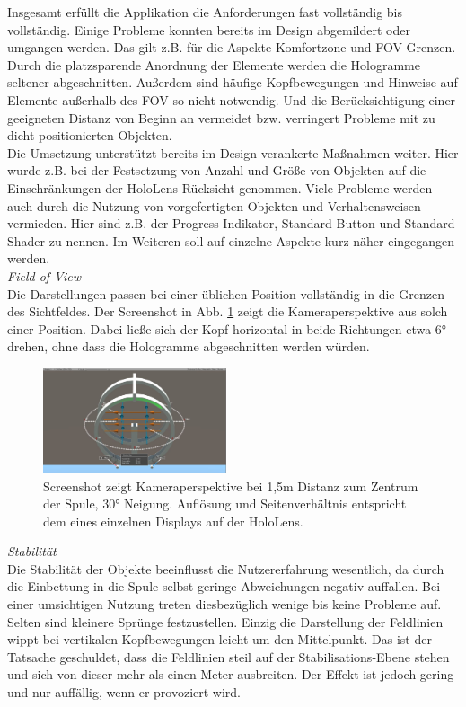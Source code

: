 Insgesamt erfüllt die Applikation die Anforderungen fast vollständig bis vollständig. Einige Probleme konnten bereits im Design abgemildert oder umgangen werden. Das gilt z.B. für die Aspekte Komfortzone und FOV-Grenzen. Durch die platzsparende Anordnung der Elemente werden die Hologramme seltener abgeschnitten. Außerdem sind häufige Kopfbewegungen und Hinweise auf Elemente außerhalb des FOV so nicht notwendig. Und die Berücksichtigung einer geeigneten Distanz von Beginn an vermeidet bzw. verringert Probleme mit zu dicht positionierten Objekten.\\

Die Umsetzung unterstützt bereits im Design verankerte Maßnahmen weiter. Hier wurde z.B. bei der Festsetzung von Anzahl und Größe von Objekten auf die Einschränkungen der HoloLens Rücksicht genommen. Viele Probleme werden auch durch die Nutzung von vorgefertigten Objekten und Verhaltensweisen vermieden. Hier sind z.B. der Progress Indikator, Standard-Button und Standard-Shader zu nennen. Im Weiteren soll auf einzelne Aspekte kurz näher eingegangen werden.\\

\textit{Field of View}\\
Die Darstellungen passen bei einer üblichen Position vollständig in die Grenzen des Sichtfeldes. Der Screenshot in Abb. \ref{img:fov} zeigt die Kameraperspektive aus solch einer Position. Dabei ließe sich der Kopf horizontal in beide Richtungen etwa 6° drehen, ohne dass die Hologramme abgeschnitten werden würden.
\begin{figure}
	\centering
	\includegraphics[width=0.48\textwidth]{images/fov.jpg}
	\caption{Screenshot zeigt Kameraperspektive bei 1,5m Distanz zum Zentrum der Spule, 30° Neigung. Auflösung und Seitenverhältnis entspricht dem eines einzelnen Displays auf der HoloLens.}
	\label{img:fov}
\end{figure}

\textit{Stabilität}\\
Die Stabilität der Objekte beeinflusst die Nutzererfahrung wesentlich, da durch die Einbettung in die Spule selbst geringe Abweichungen negativ auffallen. Bei einer umsichtigen Nutzung treten diesbezüglich wenige bis keine Probleme auf. Selten sind kleinere Sprünge festzustellen. Einzig die Darstellung der Feldlinien wippt bei vertikalen Kopfbewegungen leicht um den Mittelpunkt. Das ist der Tatsache geschuldet, dass die Feldlinien steil auf der Stabilisations-Ebene stehen und sich von dieser mehr als einen Meter ausbreiten. Der Effekt ist jedoch gering und nur auffällig, wenn er provoziert wird.\\

